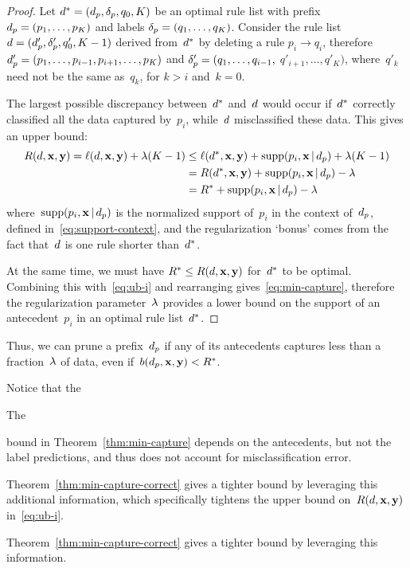\begin{arxiv}
\begin{proof}
Let ${d^* = (d_p, \delta_p, q_0, K)}$ be an optimal
rule list with prefix ${d_p = (p_1, \dots, p_K)}$
and labels ${\delta_p = (q_1, \dots, q_K)}$.
%
Consider the rule list ${{d} = (d_p', \delta_p', q_0', K-1)}$
derived from~$d^*$ by deleting a rule ${p_i \rightarrow q_i}$,
therefore ${d_p' = (p_1, \dots, p_{i-1}, p_{i+1}, \dots, p_K)}$
and ${\delta_p' = (q_1, \dots, q_{i-1},}$ ${q'_{i+1}, \dots, q'_K)}$,
where~$q'_k$ need not be the same as~$q_k$, for ${k > i}$ and~${k = 0}$.

The largest possible discrepancy between~$d^*$ and~${d}$ would occur
if~$d^*$ correctly classified all the data captured by~$p_i$,
while~${d}$ misclassified these data.
%
This gives an upper bound:
\begin{align}
R({d}, \mathbf{x}, \mathbf{y}) = \ell({d}, \mathbf{x}, \mathbf{y}) + {\lambda} (K - 1)
&\le \ell(d^*, \mathbf{x}, \mathbf{y}) + \textnormal{supp}(p_i, \mathbf{x} \,|\, d_p) + {\lambda}(K - 1) \nonumber \\
&= R(d^*, \mathbf{x}, \mathbf{y}) + \textnormal{supp}(p_i, \mathbf{x} \,|\, d_p) - {\lambda} \nonumber \\
&= R^* + \textnormal{supp}(p_i, \mathbf{x} \,|\, d_p) - {\lambda}
\label{eq:ub-i}
\end{align}
where~$\textnormal{supp}(p_i, \mathbf{x} \,|\, d_p)$ is the normalized support of~$p_i$
in the context of~$d_p$, defined in~\eqref{eq:support-context},
and the regularization `bonus' comes from the fact that~${d}$
is one rule shorter than~$d^*$.

At the same time, we must have ${R^* \le R({d}, \mathbf{x}, \mathbf{y})}$ for~$d^*$ to be optimal.
%
Combining this with~\eqref{eq:ub-i} and rearranging gives~\eqref{eq:min-capture},
therefore the regularization parameter~${\lambda}$ provides a lower bound
on the support of an antecedent~$p_i$ in an optimal rule list~$d^*$.
\end{proof}
\end{arxiv}

Thus, we can prune a prefix~$d_p$ if any of its antecedents captures less than
a fraction~${\lambda}$ of data, even if~${b(d_p, \mathbf{x}, \mathbf{y}) < R^*}$.
%
\begin{arxiv}
Notice that the
\end{arxiv}
\begin{kdd}
The
\end{kdd}
bound in Theorem~\ref{thm:min-capture}
depends on the antecedents, but not the label predictions,
and thus does not account for misclassification error.
%
\begin{arxiv}
Theorem~\ref{thm:min-capture-correct} gives a tighter bound
by leveraging this additional information, which specifically
tightens the upper bound on~$R({d}, \mathbf{x}, \mathbf{y})$ in~\eqref{eq:ub-i}.
\end{arxiv}
\begin{kdd}
Theorem~\ref{thm:min-capture-correct} gives a tighter bound
by leveraging this information.
\end{kdd}

